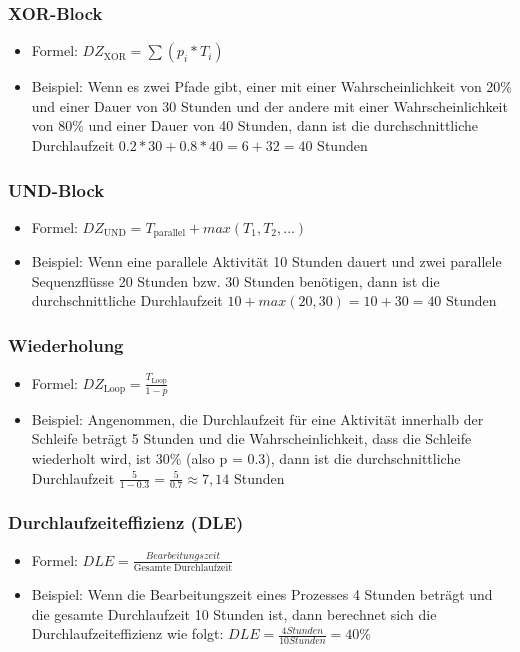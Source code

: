     \subsubsection*{XOR-Block}
        \begin{itemize}
            \item Formel: $DZ_{\text{XOR}} = \sum (p_i * T_i)$
            \item Beispiel: Wenn es zwei Pfade gibt, einer mit einer Wahrscheinlichkeit von 20\% und einer Dauer von 30 Stunden und der andere mit einer Wahrscheinlichkeit von 80\% und einer Dauer von 40 Stunden, dann ist die durchschnittliche Durchlaufzeit $0.2*30+0.8*40=6+32=40$ Stunden
        \end{itemize}
    \subsubsection*{UND-Block}
        \begin{itemize}
            \item Formel: $DZ_{\text{UND}} = T_{\text{parallel}} + max(T_1, T_2, ...)$
            \item Beispiel: Wenn eine parallele Aktivität 10 Stunden dauert und zwei parallele Sequenzflüsse 20 Stunden bzw. 30 Stunden benötigen, dann ist die durchschnittliche Durchlaufzeit $10+max(20, 30)=10+30=40$ Stunden
        \end{itemize}
    \subsubsection*{Wiederholung}
        \begin{itemize}
            \item Formel: $DZ_{\text{Loop}} = \frac{T_{\text{Loop}}}{1-p}$
            \item Beispiel: Angenommen, die Durchlaufzeit für eine Aktivität innerhalb der Schleife beträgt 5 Stunden und die Wahrscheinlichkeit, dass die Schleife wiederholt wird, ist 30\% (also p = 0.3), dann ist die durchschnittliche Durchlaufzeit $\frac{5}{1-0.3}=\frac{5}{0.7} \approx 7,14$ Stunden
        \end{itemize}
    \subsubsection*{Durchlaufzeiteffizienz (DLE)}
        \begin{itemize}
            \item Formel: $DLE = \frac{Bearbeitungszeit}{\text{Gesamte Durchlaufzeit}}$
            \item Beispiel: Wenn die Bearbeitungszeit eines Prozesses 4 Stunden beträgt und die gesamte Durchlaufzeit 10 Stunden ist, dann berechnet sich die Durchlaufzeiteffizienz wie folgt: $DLE= \frac{4 Stunden}{10 Stunden}=40\%$
        \end{itemize}